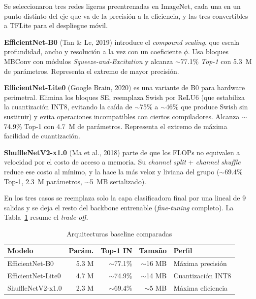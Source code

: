 \documentclass[12pt,letterpaper]{article}
\begin{document}
Se seleccionaron tres redes ligeras preentrenadas en ImageNet, cada una en un punto distinto del eje que va de la precisi\'on a la eficiencia, y las tres convertibles a TFLite para el despliegue m\'ovil.

\textbf{EfficientNet-B0} (Tan \& Le, 2019) introduce el \textit{compound scaling}, que escala profundidad, ancho y resoluci\'on a la vez con un coeficiente $\phi$. Usa bloques MBConv con m\'odulos \textit{Squeeze-and-Excitation} y alcanza $\sim$77.1\% \textit{Top-1} con 5.3~M de par\'ametros. Representa el extremo de mayor precisi\'on.

\textbf{EfficientNet-Lite0} (Google Brain, 2020) es una variante de B0 para hardware perimetral. Elimina los bloques SE, reemplaza Swish por ReLU6 (que estabiliza la cuantizaci\'on INT8, evitando la ca\'ida de $\sim$75\% a $\sim$46\% que produce Swish sin sustituir) y evita operaciones incompatibles con ciertos compiladores. Alcanza $\sim$74.9\% Top-1 con 4.7~M de par\'ametros. Representa el extremo de m\'axima facilidad de cuantizaci\'on.

\textbf{ShuffleNetV2-x1.0} (Ma et al., 2018) parte de que los FLOPs no equivalen a velocidad por el costo de acceso a memoria. Su \textit{channel split} + \textit{channel shuffle} reduce ese costo al m\'inimo, y la hace la m\'as veloz y liviana del grupo ($\sim$69.4\% Top-1, 2.3~M par\'ametros, $\sim$5~MB serializado).

En los tres casos se reemplaza solo la capa clasificadora final por una lineal de 9 salidas y se deja el resto del backbone entrenable (\textit{fine-tuning} completo). La Tabla~\ref{tab:models} resume el \textit{trade-off}.

\begin{table}[H]
\caption{Arquitecturas baseline comparadas}
\label{tab:models}
\centering
\small
\begin{singlespace}
\begin{tabular}{lrrrl}
\toprule
\textbf{Modelo} & \textbf{Par\'am.} & \textbf{Top-1 IN} & \textbf{Tama\~no} & \textbf{Perfil} \\
\midrule
EfficientNet-B0 & 5.3 M & $\sim$77.1\% & $\sim$16 MB & M\'axima precisi\'on \\
EfficientNet-Lite0 & 4.7 M & $\sim$74.9\% & $\sim$14 MB & Cuantizaci\'on INT8 \\
ShuffleNetV2-x1.0 & 2.3 M & $\sim$69.4\% & $\sim$5 MB & M\'axima eficiencia \\
\bottomrule
\end{tabular}
\end{singlespace}
\end{table}
\end{document}

